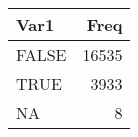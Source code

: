 
\begin{tabular}[t]{lr}
\toprule
Var1 & Freq\\
\midrule
FALSE & 16535\\
TRUE & 3933\\
NA & 8\\
\bottomrule
\end{tabular}
